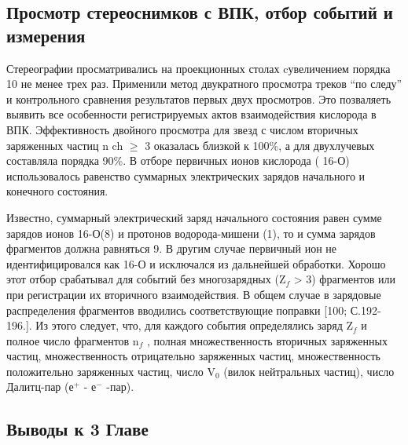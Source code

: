 \documentclass[fontsize=14pt]{scrarticle}
\begin{document}
\subsection{Просмотр стереоснимков с ВПК, отбор событий и измерения}
\hspace{0.6cm}
Стереографии просматривались на проекционных столах cувеличением
порядка 10 не менее трех раз. Применили метод двукратного просмотра
треков “по следу” и контрольного сравнения результатов первых двух
просмотров. Это позваляеть выявить все особенности регистрируемых актов взаимодействия кислорода в ВПК. Эффективность двойного просмотра для звезд с числом вторичных заряженных частиц n ch $\ge$ 3 оказалась близкой к 100\%, а для двухлучевых составляла порядка 90\%. В отборе первичных ионов кислорода ( 16-О) использовалось равенство суммарных электрических зарядов начального и конечного состояния.



Известно, суммарный электрический заряд начального состояния равен сумме зарядов ионов 16-О(8) и протонов водорода-мишени (1), то и сумма зарядов фрагментов должна равняться 9. В другим случае первичный ион не идентифицировался как 16-О и исключался из дальнейшей обработки. Хорошо этот отбор срабатывал для
событий без многозарядных (Z$_{f}$ > 3) фрагментов или при регистрации их вторичного взаимодействия. В общем случае в зарядовые распределения фрагментов вводились соответствующие поправки [100; С.192-196.]. Из этого следует, что, для каждого события определялись заряд Z$_{f}$ и полное число
фрагментов n$_{f}$ , полная множественность вторичных заряженных частиц, множественность отрицательно заряженных частиц, множественность положительно заряженных частиц, число V$_{0}$ (вилок
нейтральных частиц), число Далитц-пар (е$^{+}$ - е$^{-}$ -пар).

\newpage

\subsection*{Выводы к 3 Главе}
\end{document}
